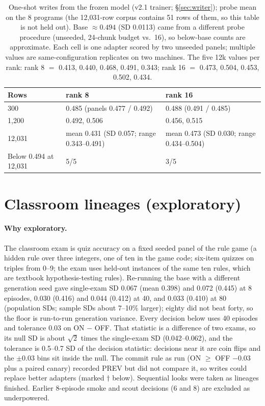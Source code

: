 \documentclass{article}
\begin{document}
\begin{table}[h]
\centering
\footnotesize
\caption{One-shot writes from the frozen model (v2.1 trainer; \S\ref{sec:writer}); probe mean on the 8 programs (the 12{,}031-row corpus contains 51 rows of them, so this table is not held out). Base $\approx 0.494$ (SD 0.0113) came from a different probe procedure (unseeded, 24-chunk budget vs.\ 16), so below-base counts are approximate. Each cell is one adapter scored by two unseeded panels; multiple values are same-configuration replicates on two machines. The five 12k values per rank: rank 8 $=$ 0.413, 0.440, 0.468, 0.491, 0.343; rank 16 $=$ 0.473, 0.504, 0.453, 0.502, 0.434.}
\label{tab:rankdose}
\begin{tabular}{lll}
\toprule
Rows & rank 8 & rank 16 \\
\midrule
300 & 0.485 (panels 0.477 / 0.492) & 0.488 (0.491 / 0.485) \\
1{,}200 & 0.492, 0.506 & 0.456, 0.515 \\
12{,}031 & mean 0.431 (SD 0.057; range 0.343--0.491) & mean 0.473 (SD 0.030; range 0.434--0.504) \\
Below 0.494 at 12{,}031 & 5/5 & 3/5 \\
\bottomrule
\end{tabular}
\end{table}

\section{Classroom lineages (exploratory)}
\label{app:lineages}

\paragraph{Why exploratory.} The classroom exam is quiz accuracy on a fixed seeded panel of the rule game (a hidden rule over three integers, one of ten in the game code; six-item quizzes on triples from 0--9; the exam uses held-out instances of the same ten rules, which are textbook hypothesis-testing rules). Re-running the base with a different generation seed gave single-exam SD 0.067 (mean 0.398) and 0.072 (0.445) at 8 episodes, 0.030 (0.416) and 0.044 (0.412) at 40, and 0.033 (0.410) at 80 (population SDs; sample SDs about 7--10\% larger); eighty did not beat forty, so the floor is run-to-run generation variance. Every decision below uses 40 episodes and tolerance 0.03 on ON $-$ OFF. That statistic is a difference of two exams, so its null SD is about $\sqrt{2}$ times the single-exam SD (0.042--0.062), and the tolerance is 0.5--0.7 SD of the decision statistic: decisions near it are coin flips and the $\pm 0.03$ bins sit inside the null. The commit rule as run (ON $\ge$ OFF $-0.03$ plus a paired canary) recorded PREV but did not compare it, so writes could replace better adapters (marked $\dagger$ below). Sequential looks were taken as lineages finished. Earlier 8-episode smoke and scout decisions (6 and 8) are excluded as underpowered.
\end{document}
